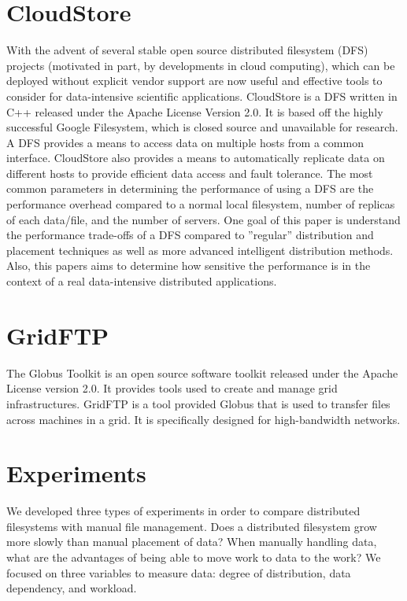 \documentclass{rspublic}
\begin{document}
\section{CloudStore} With the advent of several stable open source
distributed filesystem (DFS) projects (motivated in part, by
developments in cloud computing), which can be deployed without explicit
vendor support are now useful and effective tools to consider for
data-intensive scientific applications.  CloudStore is a DFS written in
C++ released under the Apache License Version 2.0.  It is based off the
highly successful Google Filesystem, which is closed source and
unavailable for research.  A DFS provides a means to access data on
multiple hosts from a common interface.  CloudStore also provides a
means to automatically replicate data on different hosts to provide
efficient data access and fault tolerance.  The most common parameters
in determining the performance of using a DFS are the performance
overhead compared to a normal local filesystem, number of replicas of
each data/file, and the number of servers.  One goal of this paper is
understand the performance trade-offs of a DFS compared to ''regular''
distribution and placement techniques as well as more advanced
intelligent distribution methods.  Also, this papers aims to determine
how sensitive the performance is in the context of a real data-intensive
distributed applications.

\section{GridFTP} The Globus Toolkit is an open source software toolkit
released under the Apache License version 2.0.  It provides tools used
to create and manage grid infrastructures.  GridFTP is a tool provided
Globus that is used to transfer files across machines in a grid.  It is
specifically designed for high-bandwidth networks.


\section{Experiments} We developed three
types of experiments in order to compare distributed filesystems with
manual file management.  Does a distributed filesystem grow more slowly
than manual placement of data?  When manually handling data, what are
the advantages of being able to move work to data to the work?  We
focused on three variables to measure data:  degree of distribution,
data dependency, and workload.
\end{document}
